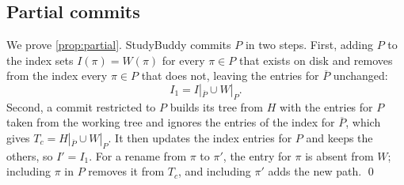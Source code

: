 \subsection{Partial commits}

We prove \cref{prop:partial}. StudyBuddy commits $P$ in two steps. First, adding $P$ to the index sets
$I(\pi) = W(\pi)$ for every $\pi \in P$ that exists on disk and removes from the
index every $\pi \in P$ that does not, leaving the entries for $\overline{P}$
unchanged:
\begin{equation}
  I_1 = I|_{\overline{P}} \cup W|_{P} .
\end{equation}
Second, a commit restricted to $P$ builds its tree from $H$ with the entries
for $P$ taken from the working tree and ignores the entries of the index for
$\overline{P}$, which gives $T_c = H|_{\overline{P}} \cup W|_{P}$. It then
updates the index entries for $P$ and keeps the others, so $I' = I_1$. For a
rename from $\pi$ to $\pi'$, the entry for $\pi$ is absent from $W$; including
$\pi$ in $P$ removes it from $T_c$, and including $\pi'$ adds the new path. \qed
